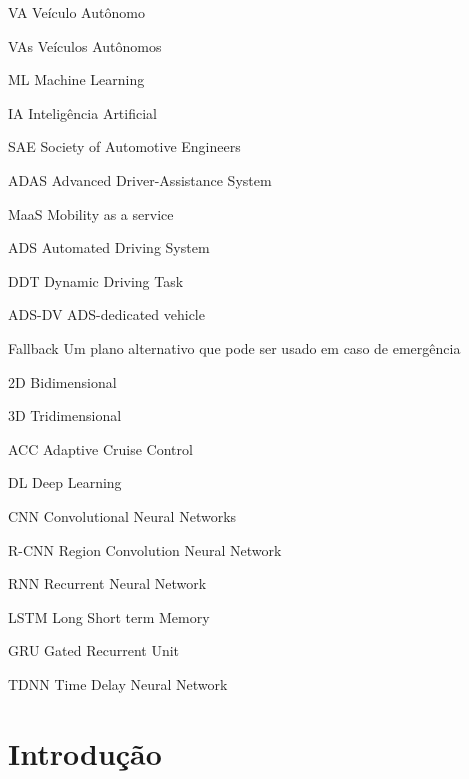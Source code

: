 \documentclass[
	12pt,				%
	openany, %
	a4paper,			%
	english,			%
	french,				%
	spanish,			%
	brazil				%
	]{abntex2}
\let\cleardoublepage\clearpage %
\begin{document}
\begin{siglas} \label{eq:1}
	\item[VA] Veículo Autônomo 
	\item[VAs] Veículos Autônomos
	\item[ML] Machine Learning
	\item[IA] Inteligência Artificial
	\item[SAE] Society of Automotive Engineers
	\item[ADAS] Advanced Driver-Assistance System
	\item[MaaS] Mobility as a service
	\item[ADS] Automated Driving System
	\item[DDT] Dynamic Driving Task
	\item[ADS-DV] ADS-dedicated vehicle
	\item[Fallback] Um plano alternativo que pode ser usado em caso de emergência
	\item[2D] Bidimensional
	\item[3D] Tridimensional
	\item[ACC] Adaptive Cruise Control
	\item[DL] Deep Learning
	\item[CNN] Convolutional Neural Networks
	\item[R-CNN] Region Convolution Neural Network
	\item[RNN] Recurrent Neural Network
	\item[LSTM] Long Short term Memory
	\item[GRU] Gated Recurrent Unit 
	\item[TDNN] Time Delay Neural Network
\end{siglas}




\tableofcontents*
\cleardoublepage



\textual

\chapter*[Introdução]{Introdução}
\end{document}
